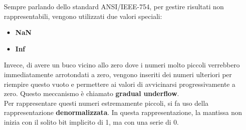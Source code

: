 \documentclass{article}
\begin{document}
Sempre parlando dello standard ANSI/IEEE-754, per gestire risultati non rappresentabili, 
vengono utilizzati due valori speciali:
\begin{itemize}
    \item \textbf{NaN} 
    \item \textbf{Inf}
\end{itemize}
Invece, di avere un buco vicino allo zero dove i numeri molto piccoli
verrebbero immediatamente arrotondati a zero, vengono inseriti dei numeri ulteriori per
riempire questo vuoto e permettere ai valori di avvicinarsi progressivamente a zero.
Questo meccanismo è chiamato \textbf{gradual underflow}.\\ 
Per rappresentare questi numeri estremamente piccoli, si fa uso della
rappresentazione \textbf{denormalizzata}. In questa rappresentazione, la
mantissa  non inizia con il solito bit implicito di 1, ma  con una serie di 0.
\end{document}
